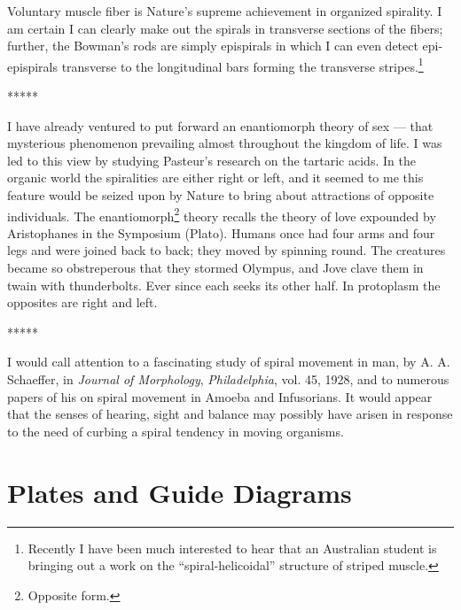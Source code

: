 \documentclass[a4paper, 12pt, oneside]{article}
\begin{document}
Voluntary muscle fiber is Nature's supreme achievement in organized spirality. I am certain I can clearly make out the spirals in transverse sections of the fibers; further, the Bowman's rods are simply epispirals in which I can even detect epi-epispirals transverse to the longitudinal bars forming the transverse stripes.\footnote{Recently I have been much interested to hear that an Australian student is bringing out a work on the ``spiral-helicoidal'' structure of striped muscle.}

\centerline{*\hspace{15mm}*\hspace{15mm}*\hspace{15mm}*\hspace{15mm}*}
\bigskip

I have already ventured to put forward an enantiomorph theory of sex --- that mysterious phenomenon prevailing almost throughout the kingdom of life. I was led to this view by studying Pasteur's research on the tartaric acids. In the organic world the spiralities are either right or left, and it seemed to me this feature would be seized upon by Nature to bring about attractions of opposite individuals. The enantiomorph\footnote{Opposite form.} theory recalls the theory of love expounded by Aristophanes in the Symposium (Plato). Humans once had four arms and four legs and were joined back to back; they moved by spinning round. The creatures became so obstreperous that they stormed Olympus, and Jove clave them in twain with thunderbolts. Ever since each seeks its other half. In protoplasm the opposites are right and left.

\centerline{*\hspace{15mm}*\hspace{15mm}*\hspace{15mm}*\hspace{15mm}*}
\bigskip

I would call attention to a fascinating study of spiral movement in man, by A. A. Schaeffer, in \emph{Journal of Morphology}, \emph{Philadelphia}, vol. 45, 1928, and to numerous papers of his on spiral movement in Amoeba and Infusorians. It would appear that the senses of hearing, sight and balance may possibly have arisen in response to the need of curbing a spiral tendency in moving organisms.
\clearpage
\section{Plates and Guide Diagrams}
\end{document}
